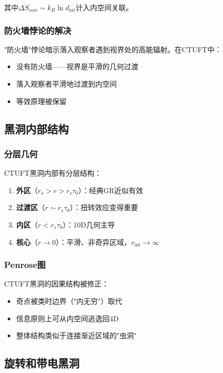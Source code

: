 其中$\Delta S_{\text{corr}} \sim k_B \ln d_{\text{int}}$计入内空间关联。

\subsubsection{防火墙悖论的解决}

"防火墙"悖论暗示落入观察者遇到视界处的高能辐射。在CTUFT中：
\begin{itemize}
    \item 没有防火墙——视界是平滑的几何过渡
    \item 落入观察者平滑地过渡到内空间
    \item 等效原理被保留
\end{itemize}

\subsection{黑洞内部结构}

\subsubsection{分层几何}

CTUFT黑洞内部有分层结构：
\begin{enumerate}
    \item \textbf{外区}（$r_s > r > r_s\tau_0$）：经典GR近似有效
    \item \textbf{过渡区}（$r \sim r_s\tau_0$）：扭转效应变得重要
    \item \textbf{内区}（$r < r_s\tau_0$）：10D几何主导
    \item \textbf{核心}（$r \to 0$）：平滑、非奇异区域，$r_{\text{int}} \to \infty$
\end{enumerate}

\subsubsection{Penrose图}

CTUFT黑洞的因果结构被修正：
\begin{itemize}
    \item 奇点被类时边界（"内无穷"）取代
    \item 信息原则上可从内空间逃逸回4D
    \item 整体结构类似于连接渐近区域的"虫洞"
\end{itemize}

\subsection{旋转和带电黑洞}

